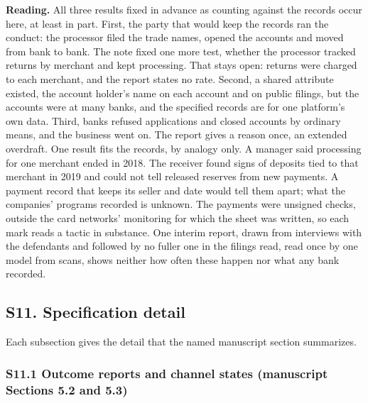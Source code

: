 \documentclass[
  11pt,
]{article}
\begin{document}
\textbf{Reading.} All three results fixed in advance as counting against
the records occur here, at least in part. First, the party that would
keep the records ran the conduct: the processor filed the trade names,
opened the accounts and moved from bank to bank. The note fixed one more
test, whether the processor tracked returns by merchant and kept
processing. That stays open: returns were charged to each merchant, and
the report states no rate. Second, a shared attribute existed, the
account holder's name on each account and on public filings, but the
accounts were at many banks, and the specified records are for one
platform's own data. Third, banks refused applications and closed
accounts by ordinary means, and the business went on. The report gives a
reason once, an extended overdraft. One result fits the records, by
analogy only. A manager said processing for one merchant ended in 2018.
The receiver found signs of deposits tied to that merchant in 2019 and
could not tell released reserves from new payments. A payment record
that keeps its seller and date would tell them apart; what the
companies' programs recorded is unknown. The payments were unsigned
checks, outside the card networks' monitoring for which the sheet was
written, so each mark reads a tactic in substance. One interim report,
drawn from interviews with the defendants and followed by no fuller one
in the filings read, read once by one model from scans, shows neither
how often these happen nor what any bank recorded.

\FloatBarrier

\hypertarget{s11.-specification-detail}{%
\subsection{S11. Specification detail}\label{s11.-specification-detail}}

\suppressfloats[t]

Each subsection gives the detail that the named manuscript section
summarizes.

\hypertarget{s11.1-outcome-reports-and-channel-states-manuscript-sections-5.2-and-5.3}{%
\subsubsection{S11.1 Outcome reports and channel states (manuscript
Sections 5.2 and
5.3)}\label{s11.1-outcome-reports-and-channel-states-manuscript-sections-5.2-and-5.3}}
\end{document}
